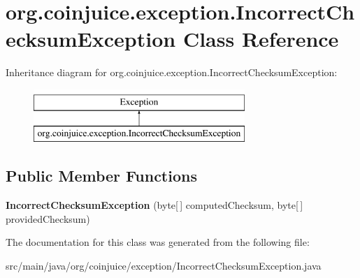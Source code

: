 \hypertarget{classorg_1_1coinjuice_1_1exception_1_1_incorrect_checksum_exception}{\section{org.\-coinjuice.\-exception.\-Incorrect\-Checksum\-Exception Class Reference}
\label{classorg_1_1coinjuice_1_1exception_1_1_incorrect_checksum_exception}
}
Inheritance diagram for org.\-coinjuice.\-exception.\-Incorrect\-Checksum\-Exception\-:\begin{figure}[H]
\begin{center}
\leavevmode
\includegraphics[height=2.000000cm]{classorg_1_1coinjuice_1_1exception_1_1_incorrect_checksum_exception}
\end{center}
\end{figure}
\subsection*{Public Member Functions}
\begin{DoxyCompactItemize}
\item 
\hypertarget{classorg_1_1coinjuice_1_1exception_1_1_incorrect_checksum_exception_a8740bd4527f4586a4bbf92a5a67b9019}{{\bfseries Incorrect\-Checksum\-Exception} (byte\mbox{[}$\,$\mbox{]} computed\-Checksum, byte\mbox{[}$\,$\mbox{]} provided\-Checksum)}\label{classorg_1_1coinjuice_1_1exception_1_1_incorrect_checksum_exception_a8740bd4527f4586a4bbf92a5a67b9019}

\end{DoxyCompactItemize}


The documentation for this class was generated from the following file\-:\begin{DoxyCompactItemize}
\item 
src/main/java/org/coinjuice/exception/Incorrect\-Checksum\-Exception.\-java\end{DoxyCompactItemize}
